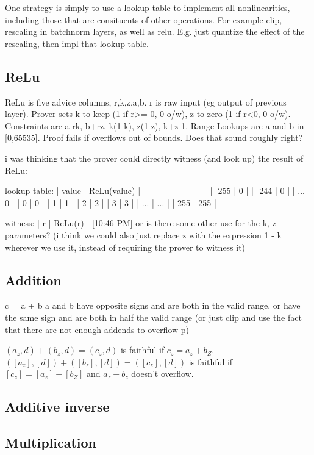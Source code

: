 \documentclass[12pt]{amsart}
\theoremstyle{plain}
\theoremstyle{definition}
\theoremstyle{definition}
\theoremstyle{definition}
\theoremstyle{definition}
\theoremstyle{definition}
\begin{document}
One strategy is simply to use a lookup table to implement all nonlinearities, including those that are consituents of other operations.  For example clip, rescaling in batchnorm layers, as well as relu.  E.g. just quantize the effect of the rescaling, then impl that lookup table.



\subsection{ReLu}

ReLu is five advice columns, r,k,z,a,b.  r is raw input (eg output of previous layer). Prover sets k to keep (1 if r>= 0, 0 o/w), z to zero (1 if r<0, 0 o/w). Constraints are a-rk, b+rz, k(1-k), z(1-z), k+z-1.  Range Lookups are a and  b in [0,65535].  Proof fails if overflows out of bounds. Does that sound roughly right?

i was thinking that the prover could directly witness (and look up) the result of ReLu:

lookup table:
| value | ReLu(value) |
-----------------------
|  -255 |      0      |
|  -244 |      0      |
|   ... |      0      |
|    0  |      0      |
|    1  |      1      |
|    2  |      2      |
|    3  |      3      |
|  ...  |     ...     |
|  255  |     255     |

witness:
|   r   | ReLu(r) |
[10:46 PM]
or is there some other use for the k, z parameters? (i think we could also just replace z with the expression 1 - k wherever we use it, instead of requiring the prover to witness it)


\subsection{Addition}
c = a + b
a and b have opposite signs and are both in the valid range, or have the same sign and are both in half the valid range (or just clip and use the fact that there are not enough addends to overflow p)


$(a_z,d) + (b_z,d) = (c_z, d)$ is faithful if $c_z = a_z + b_Z$.
$([a_z],[d]) + ([b_z],[d]) = ([c_z], [d])$ is faithful if $[c_z] = [a_z] + [b_Z]$ and $a_z + b_z$ doesn't overflow.  


\subsection{Additive inverse}


\subsection{Multiplication}
\end{document}
